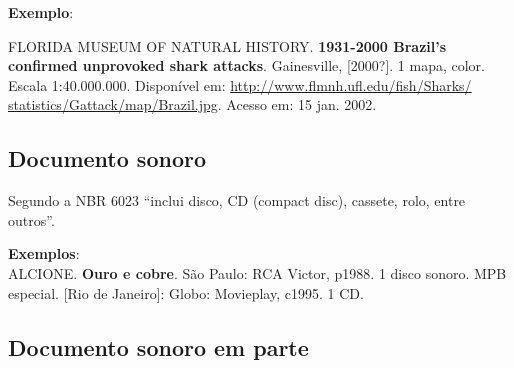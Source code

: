 \begin{exemplomanual}
\textbf{Exemplo}:\\
\begin{singlespace}
FLORIDA MUSEUM OF NATURAL HISTORY. \textbf{1931-2000 Brazil’s confirmed unprovoked shark attacks}. Gainesville, [2000?]. 1 mapa, color. Escala 1:40.000.000. Disponível em: \url{http://www.flmnh.ufl.edu/fish/Sharks/ statistics/Gattack/map/Brazil.jpg}. Acesso em: 15 jan. 2002.
\end{singlespace}
\end{exemplomanual}


\subsection{Documento sonoro}

Segundo a NBR 6023 \cite[p.13]{NBR6023:2002} ``inclui disco, CD (compact disc), cassete, rolo, entre outros''.

\begin{flushleft}
\begin{singlespace}
\end{singlespace}
\end{flushleft}

\begin{exemplomanual}
\textbf{Exemplos}:\\
ALCIONE. \textbf{Ouro e cobre}. São Paulo: RCA Victor, p1988. 1 disco sonoro.
\newline
\newline
MPB especial. [Rio de Janeiro]: Globo: Movieplay, c1995. 1 CD.
\end{exemplomanual}


\subsection{Documento sonoro em parte}

\begin{flushleft}
\begin{singlespace}
\end{singlespace}
\end{flushleft}

